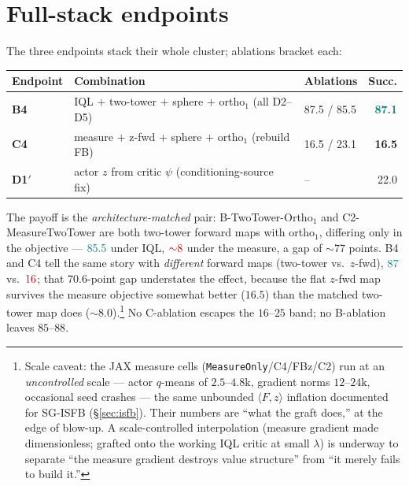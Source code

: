 \documentclass[11pt]{article}
\newcommand{\B}[1]{\textbf{#1}}
\newcommand{\good}[1]{\textcolor{teal}{#1}}
\newcommand{\bad}[1]{\textcolor{red!70!black}{#1}}
\begin{document}
\section{Full-stack endpoints}
The three endpoints stack their whole cluster; ablations bracket each:
\begin{center}\small
\begin{tabular}{@{}l l l r@{}}
\toprule
\B{Endpoint} & \B{Combination} & \B{Ablations} & \B{Succ.} \\
\midrule
\B{B4} & IQL $+$ two-tower $+$ sphere $+$ ortho$_1$ (all D2--D5) & 87.5 / 85.5 & \good{\B{87.1}} \\
\B{C4} & measure $+$ z-fwd $+$ sphere $+$ ortho$_1$ (rebuild FB) & 16.5 / 23.1 & \bad{\B{16.5}} \\
\B{D1$'$} & actor $z$ from critic $\psi$ (conditioning-source fix)      & --          & \bad{22.0} \\
\bottomrule
\end{tabular}
\end{center}
\noindent The payoff is the \emph{architecture-matched} pair: B-TwoTower-Ortho$_1$ and
C2-MeasureTwoTower are both two-tower forward maps with ortho$_1$, differing only in the
objective --- $\good{85.5}$ under IQL, $\bad{{\sim}8}$ under the measure, a gap of
${\sim}77$ points. B4 and C4 tell the same story with \emph{different} forward maps
(two-tower vs.\ $z$-fwd), $\good{87}$ vs.\ $\bad{16}$; that $70.6$-point gap understates
the effect, because the flat $z$-fwd map survives the measure objective somewhat better
($16.5$) than the matched two-tower map does
(${\sim}8.0$).\footnote{Scale caveat: the JAX measure cells (\texttt{MeasureOnly}/C4/FBz/C2)
run at an \emph{uncontrolled} scale --- actor $q$-means of $2.5$--$4.8\mathrm{k}$,
gradient norms $12$--$24\mathrm{k}$, occasional seed crashes --- the same unbounded
$\langle F,z\rangle$ inflation documented for SG-ISFB (\S\ref{sec:isfb}). Their
numbers are ``what the graft does,'' at the edge of blow-up. A scale-controlled
interpolation (measure gradient made dimensionless; grafted onto the working IQL
critic at small $\lambda$) is underway to separate ``the measure gradient destroys
value structure'' from ``it merely fails to build it.''} No C-ablation escapes the
$16$--$25$ band; no B-ablation leaves $85$--$88$.

\end{document}
